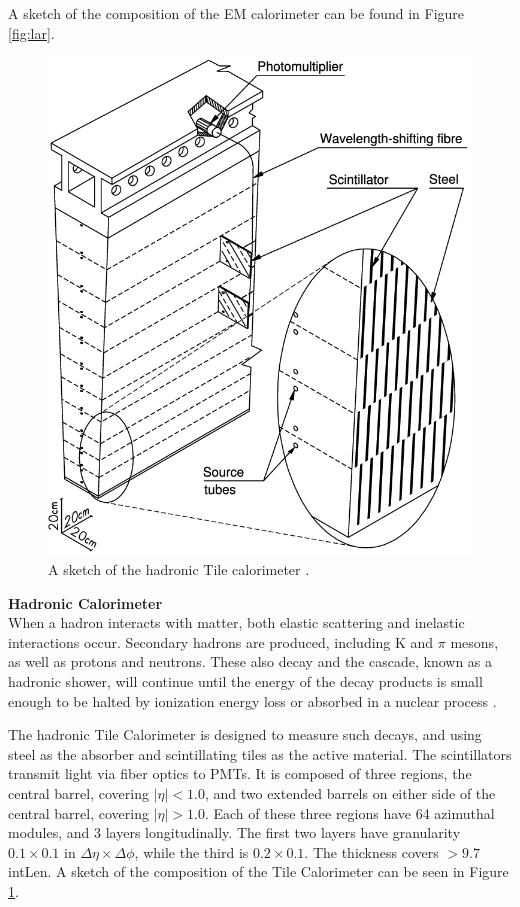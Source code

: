 A sketch of the composition of the \gls{EM} calorimeter can be found in Figure \ref{fig:lar}.

\begin{figure}[!ht]
    \centering
    \includegraphics[width=.65\textwidth]{chapters/chapter2_experiment/images/tile.png}
    \caption{A sketch of the hadronic Tile calorimeter \cite{tile-tdr}.}
    \label{fig:tile}
\end{figure}


\noindent\textbf{Hadronic Calorimeter}\\
\indent When a hadron interacts with matter, both elastic scattering and inelastic interactions occur. Secondary hadrons are produced, including K and $\pi$ mesons, as well as protons and neutrons. These also decay and the cascade, known as a hadronic shower, will continue until the energy of the decay products is small enough to be halted by ionization energy loss or absorbed in a nuclear process \cite{detectors-for-radiation}.

\indent The hadronic Tile Calorimeter is designed to measure such decays, and using steel as the absorber and scintillating tiles as the active material. The scintillators transmit light via fiber optics to \glspl{PMT}. It is composed of three regions, the central barrel, covering $|\eta| < 1.0$, and two extended barrels on either side of the central barrel, covering $|\eta| > 1.0$. Each of these three regions have 64 azimuthal modules, and 3 layers longitudinally. The first two layers have granularity $0.1 \times 0.1$ in $\Delta\eta \times \Delta \phi$, while the third is $0.2 \times 0.1$. The thickness covers $>9.7$ \gls{intLen}. A sketch of the composition of the Tile Calorimeter can be seen in Figure \ref{fig:tile}.

